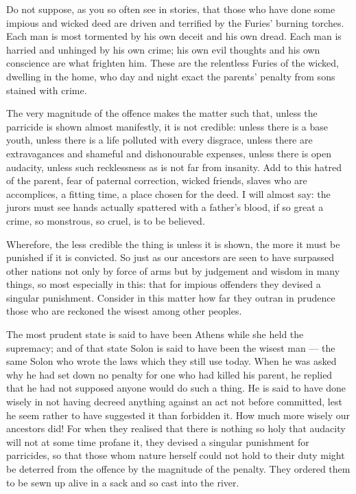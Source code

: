  Do not suppose, as you so often see in stories, that those who have done some impious and wicked deed are driven and terrified by the Furies' burning torches. Each man is most tormented by his own deceit and his own dread. Each man is harried and unhinged by his own crime; his own evil thoughts and his own conscience are what frighten him. These are the relentless Furies of the wicked, dwelling in the home, who day and night exact the parents' penalty from sons stained with crime.

 The very magnitude of the offence makes the matter such that, unless the parricide is shown almost manifestly, it is not credible: unless there is a base youth, unless there is a life polluted with every disgrace, unless there are extravagances and shameful and dishonourable expenses, unless there is open audacity, unless such recklessness as is not far from insanity. Add to this hatred of the parent, fear of paternal correction, wicked friends, slaves who are accomplices, a fitting time, a place chosen for the deed. I will almost say: the jurors must see hands actually spattered with a father's blood, if so great a crime, so monstrous, so cruel, is to be believed.

 Wherefore, the less credible the thing is unless it is shown, the more it must be punished if it is convicted. So just as our ancestors are seen to have surpassed other nations not only by force of arms but by judgement and wisdom in many things, so most especially in this: that for impious offenders they devised a singular punishment. Consider in this matter how far they outran in prudence those who are reckoned the wisest among other peoples.

 The most prudent state is said to have been Athens while she held the supremacy; and of that state Solon is said to have been the wisest man --- the same Solon who wrote the laws which they still use today. When he was asked why he had set down no penalty for one who had killed his parent, he replied that he had not supposed anyone would do such a thing. He is said to have done wisely in not having decreed anything against an act not before committed, lest he seem rather to have suggested it than forbidden it. How much more wisely our ancestors did! For when they realised that there is nothing so holy that audacity will not at some time profane it, they devised a singular punishment for parricides, so that those whom nature herself could not hold to their duty might be deterred from the offence by the magnitude of the penalty. They ordered them to be sewn up alive in a sack and so cast into the river.

